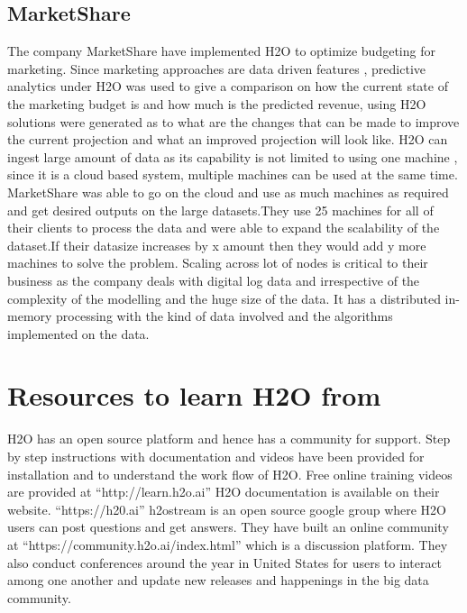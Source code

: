 \documentclass[9pt,twocolumn,twoside]{styles/osajnl}
\begin{document}
\subsection {MarketShare}
\cite{www-h2o-marketshare}
The company MarketShare have implemented H2O to optimize budgeting for
marketing. Since marketing approaches are data driven features ,
predictive analytics under H2O was used to give a comparison on how
the current state of the marketing budget is and how much is the
predicted revenue, using H2O solutions were generated as to what are
the changes that can be made to improve the current projection and
what an improved projection will look like.  H2O can ingest large
amount of data as its capability is not limited to using one machine ,
since it is a cloud based system, multiple machines can be used at the
same time.  MarketShare was able to go on the cloud and use as much
machines as required and get desired outputs on the large
datasets.They use 25 machines for all of their clients to process the
data and were able to expand the scalability of the dataset.If their
datasize increases by x amount then they would add y more machines to
solve the problem. Scaling across lot of nodes is critical to their
business as the company deals with digital log data and irrespective
of the complexity of the modelling and the huge size of the data. It
has a distributed in- memory processing with the kind of data involved
and the algorithms implemented on the data.

\section {Resources to learn H2O from}

H2O has an open source platform and hence has a community for support.\newline
 Step by step instructions with documentation and videos have
been provided for installation and to understand the work flow of H2O.\newline
 Free online training videos are provided at
“http://learn.h2o.ai”\newline
H2O documentation is available on their website.
“https://h20.ai”\newline
h2ostream is an open source google group where H2O users can
post questions and get answers.\newline
They have built an online community at
“https://community.h2o.ai/index.html” which is a discussion platform.\newline
They also conduct conferences around the year in United
States for users to interact among one another and update new releases
and happenings in the big data community.
\end{document}

